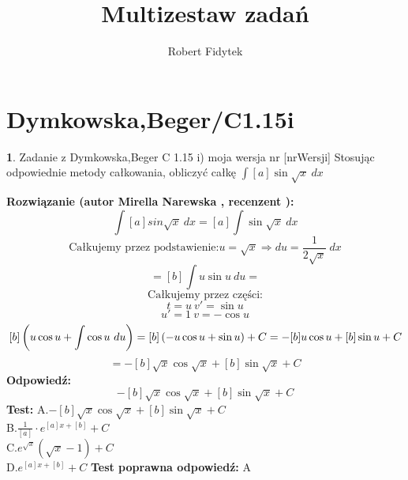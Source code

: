 \documentclass[12pt, a4paper]{article}
\title{Multizestaw zadań}
\author{Robert Fidytek}
\date{}
\theoremstyle{definition} %
\newtheorem{zad}{}
\newcommand{\kategoria}[1]{\section{#1}} %
\newcommand{\zadStart}[1]{\begin{zad}#1\newline} %
\newcommand{\zadStop}{\end{zad}}   %
\newcommand{\rozwStart}[2]{\noindent \textbf{Rozwiązanie (autor #1 , recenzent #2): }\newline} %
\newcommand{\odpStart}{\noindent \textbf{Odpowiedź:}\newline}    %
\newcommand{\odpStop}{\newline}                                             %
\newcommand{\testStart}{\noindent \textbf{Test:}\newline} %
\newcommand{\testStop}{\newline} %
\newcommand{\kluczStart}{\noindent \textbf{Test poprawna odpowiedź:}\newline} %
\newcommand{\kluczStop}{\newline} %
\begin{document}
\maketitle



\kategoria{Dymkowska,Beger/C1.15i}
\zadStart{Zadanie z Dymkowska,Beger C 1.15 i) moja wersja nr [nrWersji]}
Stosując odpowiednie metody całkowania, obliczyć całkę $\displaystyle \int [a]\sin{\sqrt{x}} \ dx$
\zadStop
\rozwStart{Mirella Narewska}{}
$$ \int [a]sin\sqrt{x} \ dx=[a]\int\sin{\sqrt{x}} \ dx$$
$$\text{Całkujemy przez podstawienie:} u=\sqrt{x}\Rightarrow du=\frac{1}{2\sqrt{x}} \ dx$$
$$=[b]\int u\sin{u} \ du=$$
$$\text{Całkujemy przez części:}$$
$$t=u \ v'=\sin{u}$$
$$u'=1 \ v=-\cos{u}$$
$$[b]\left( \-u\cos{u}+\int \cos{u} \ du\right)= [b]\left( -u\cos{u}+\sin{u}\right)+C=-[b]u\cos{u}+[b]\sin{u}+C$$
$$=-[b]\sqrt{x}\cos{\sqrt{x}}+[b]\sin{\sqrt{x}}+C$$
\odpStart
$$-[b]\sqrt{x}\cos{\sqrt{x}}+[b]\sin{\sqrt{x}}+C$$
\odpStop
\testStart
A.$-[b]\sqrt{x}\cos{\sqrt{x}}+[b]\sin{\sqrt{x}}+C$
\\
B.$\frac{1}{[a]}\cdot e^{[a]x+[b]}+C$
\\
C.$e^{\sqrt{x}}(\sqrt{x}-1)+C$
\\
D.$e^{[a]x+[b]}+C$
\testStop
\kluczStart
A
\kluczStop
\end{document}
